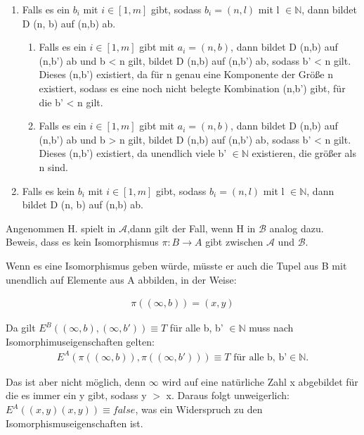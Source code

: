 \documentclass[a4paper,10pt]{article}
\begin{document}
\begin{enumerate}
\begin{enumerate}
				\begin{enumerate}
					\item
						Falls es ein $b_i$ mit $i \in [1,m]$ gibt, sodass $b_i = (n,l)$ mit l $\in \mathbb{N}$, dann bildet D (n, b) auf 
						(n,b) ab.
						\begin{enumerate}
							\item
								Falls es ein $i \in [1,m]$ gibt mit $a_i = (n,b)$, dann bildet D (n,b) auf (n,b') ab und b < n gilt, bildet D 
								(n,b) auf (n,b') ab, sodass b' < n gilt. Dieses (n,b') existiert, da für n genau eine Komponente der Größe 											n existiert, sodass es eine noch nicht belegte Kombination (n,b') gibt, für die b' < n gilt.
							\item
								Falls es ein $i \in [1,m]$ gibt mit $a_i = (n,b)$, dann bildet D (n,b) auf (n,b') ab und b > n gilt, bildet D 
								(n,b) auf (n,b') ab, sodass b' < n gilt. Dieses (n,b') existiert, da unendlich viele b' $\in \mathbb{N}$ 											existieren, die größer als n sind.
						\end{enumerate}
					\item
						Falls es kein $b_i$ mit $i \in [1,m]$ gibt, sodass $b_i = (n,l)$ mit l $\in \mathbb{N}$, dann bildet D (n, b) auf 
						(n,b) ab.
				\end{enumerate}
			\end{enumerate}
	\end{enumerate}
	
	Angenommen H. spielt in $\mathcal{A}$,dann gilt der Fall, wenn H in $\mathcal{B}$ analog dazu. \\
	
	Beweis, dass es kein Isomorphismus $\pi: B \rightarrow A$ gibt zwischen $\mathcal{A}$ und $\mathcal{B}$.
	
	Wenn es eine Isomorphismus geben würde, müsste er auch die Tupel aus B mit unendlich auf Elemente aus A abbilden, in der Weise:
	
	\begin{align*}
		\pi((\infty, b)) = (x,y)
	\end{align*}

	Da gilt $E^B((\infty, b),(\infty, b')) \equiv T$ für alle b, b' $\in \mathbb{N}$ muss nach Isomorphimuseigenschaften gelten:
	\begin{align*}
		E^A(\pi((\infty, b)),\pi((\infty, b'))) \equiv T \text{ für alle b, b'} \in \mathbb{N}. 
	\end{align*}
	
	Das ist aber nicht möglich, denn $\infty$ wird auf eine natürliche Zahl x 	abgebildet für die es immer ein y gibt, sodass y $>$ x. Daraus folgt unweigerlich:
	$E^A((x,y)(x,y)) \equiv false$, was ein Widerspruch zu den Isomorphismuseigenschaften ist.
	
\end{document}
